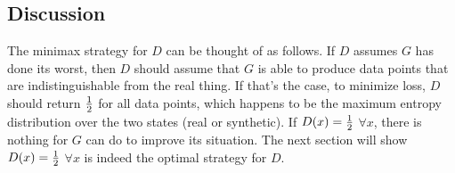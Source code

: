 \subsection{Discussion}

The minimax strategy for $D$ can be thought of as follows.  If $D$
assumes $G$ has done its worst, then $D$ should assume that $G$ is
able to produce data points that are indistinguishable from the real
thing. If that's the case, to minimize loss, $D$ should return
${1 \over 2}$ for all data points, which happens to be the maximum
entropy distribution over the two states (real or synthetic).  If
$D(x) = {1 \over 2}$ $\forall x$, there is nothing for $G$ can do to
improve its situation.  The next section will show
$D(x) = {1 \over 2}$ $\forall x$ is indeed the optimal strategy for
$D$.

